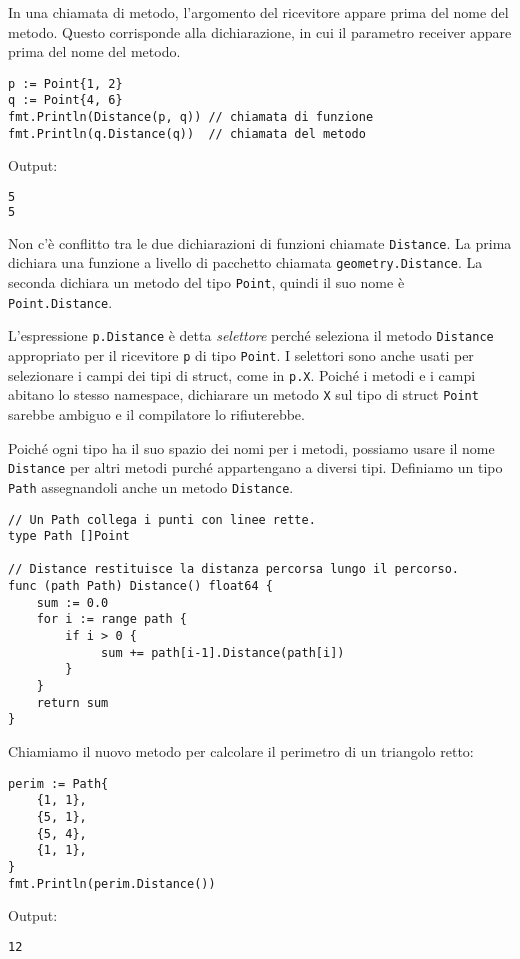 In una chiamata di metodo, l'argomento del ricevitore appare prima del nome del metodo.
Questo corrisponde alla dichiarazione, in cui il parametro receiver appare prima del nome del metodo.
\begin{lstlisting}[frame=single, label={lst:lstlisting5-1.2}]
p := Point{1, 2}
q := Point{4, 6}
fmt.Println(Distance(p, q)) // chiamata di funzione
fmt.Println(q.Distance(q))  // chiamata del metodo
\end{lstlisting}
Output:
\begin{lstlisting}[language=bash, frame=L, label={lst:lstlisting5-1.3}]
5
5
\end{lstlisting}
Non c'è conflitto tra le due dichiarazioni di funzioni chiamate \verb|Distance|.
La prima dichiara una funzione a livello di pacchetto chiamata \verb|geometry.Distance|.
La seconda dichiara un metodo del tipo \verb|Point|, quindi il suo nome è \verb|Point.Distance|.

L'espressione \verb|p.Distance| è detta \textit{selettore} perché seleziona il metodo \verb|Distance| appropriato per il ricevitore \verb|p| di tipo \verb|Point|.
I selettori sono anche usati per selezionare i campi dei tipi di struct, come in \verb|p.X|.
Poiché i metodi e i campi abitano lo stesso namespace, dichiarare un metodo \verb|X| sul tipo di struct \verb|Point| sarebbe ambiguo e il compilatore lo rifiuterebbe.

Poiché ogni tipo ha il suo spazio dei nomi per i metodi, possiamo usare il nome \verb|Distance| per altri metodi purché appartengano a diversi tipi.
Definiamo un tipo \verb|Path| assegnandoli anche un metodo \verb|Distance|.
\begin{lstlisting}[frame=single, label={lst:lstlisting5-1.4}]
// Un Path collega i punti con linee rette.
type Path []Point

// Distance restituisce la distanza percorsa lungo il percorso.
func (path Path) Distance() float64 {
    sum := 0.0
    for i := range path {
        if i > 0 {
             sum += path[i-1].Distance(path[i])
        }
    }
    return sum
}
\end{lstlisting}
Chiamiamo il nuovo metodo per calcolare il perimetro di un triangolo retto:
\begin{lstlisting}[frame=single, label={lst:lstlisting5-1.5}]
perim := Path{
    {1, 1},
    {5, 1},
    {5, 4},
    {1, 1},
}
fmt.Println(perim.Distance())
\end{lstlisting}
Output:
\begin{lstlisting}[language=bash, frame=L, label={lst:lstlisting5-1.6}]
12
\end{lstlisting}


